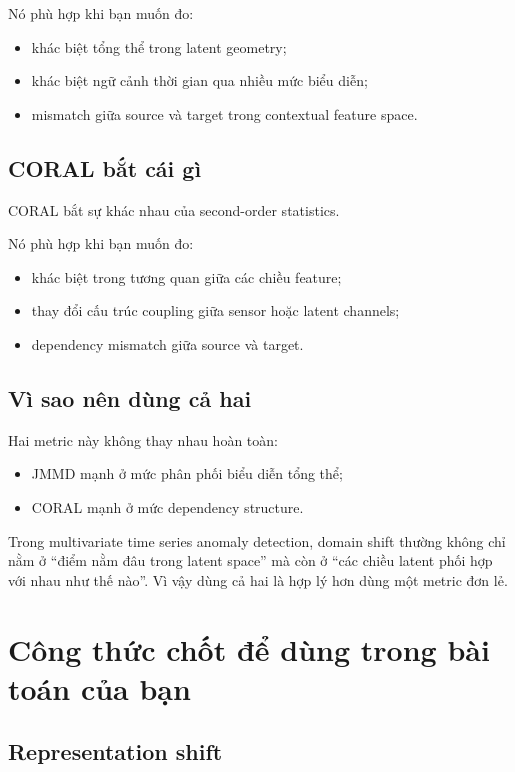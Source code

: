\documentclass[a4paper]{article}
\begin{document}
Nó phù hợp khi bạn muốn đo:

\begin{itemize}
    \item khác biệt tổng thể trong latent geometry;
    \item khác biệt ngữ cảnh thời gian qua nhiều mức biểu diễn;
    \item mismatch giữa source và target trong contextual feature space.
\end{itemize}

\subsection{CORAL bắt cái gì}

CORAL bắt sự khác nhau của second-order statistics.

Nó phù hợp khi bạn muốn đo:

\begin{itemize}
    \item khác biệt trong tương quan giữa các chiều feature;
    \item thay đổi cấu trúc coupling giữa sensor hoặc latent channels;
    \item dependency mismatch giữa source và target.
\end{itemize}

\subsection{Vì sao nên dùng cả hai}

Hai metric này không thay nhau hoàn toàn:

\begin{itemize}
    \item JMMD mạnh ở mức phân phối biểu diễn tổng thể;
    \item CORAL mạnh ở mức dependency structure.
\end{itemize}

Trong multivariate time series anomaly detection, domain shift thường không chỉ nằm ở ``điểm nằm đâu trong latent space'' mà còn ở ``các chiều latent phối hợp với nhau như thế nào''. Vì vậy dùng cả hai là hợp lý hơn dùng một metric đơn lẻ.

\section{Công thức chốt để dùng trong bài toán của bạn}

\subsection{Representation shift}
\end{document}
